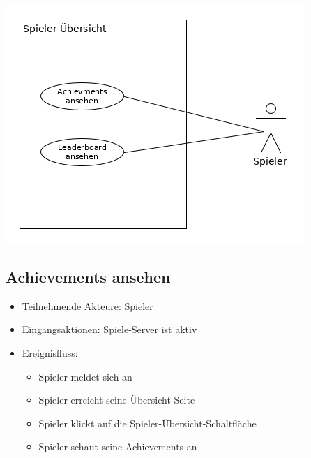 \documentclass[a4paper]{scrreprt}
\begin{document}
\newpage
    \includegraphics[width=\textwidth]{uml/export/Spieler_Ubersicht.png}
	    \subsection{Achievements ansehen}
    \begin{itemize}
        \item Teilnehmende Akteure: \Gls{Spieler}
        \item Eingangsaktionen: Spiele-Server ist aktiv
        \item Ereignisfluss:
        \begin{itemize}
            \item Spieler meldet sich an
            \item Spieler erreicht seine Übersicht-Seite
            \item Spieler klickt auf die Spieler-Übersicht-Schaltfläche
            \item Spieler schaut seine Achievements an
        \end{itemize}
    \end{itemize}
\end{document}
